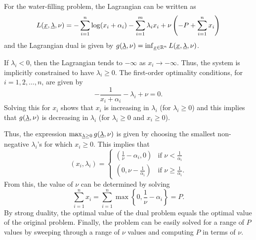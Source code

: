 \begin{example}
For the water-filling problem, the Lagrangian can be written as
\[ L(\underline{x},\underline{\lambda},\nu) = - \sum_{i=1}^n \log(x_i + \alpha_i) - \sum_{i=1}^m \lambda_i x_i + \nu \left( -P + \sum_{i=1}^n x_i \right)  \]
and the Lagrangian dual is given by $g(\underline{\lambda},\nu)
= \inf_{\underline{x}\in \mathbb{R}^n} L(\underline{x},\underline{\lambda},\nu)$.

If $\lambda_i <0$, then the Lagrangian tends to $-\infty$ as $x_i \to -\infty$.
Thus, the system is implicitly constrained to have $\lambda_i \geq 0$.
The first-order optimality conditions, for $i=1,2,\ldots,n$, are given by
\[ -\frac{1}{x_i + \alpha_i} - \lambda_i + \nu = 0.
\]
Solving this for $x_i$ shows that $x_i$ is increasing in $\lambda _i$ (for $\lambda_i \geq 0$) and this implies that $g(\underline{\lambda},\nu)$ is decreasing in $\lambda_i$ (for $\lambda_i \geq 0$ and $x_i \geq 0$).

Thus, the expression
$\max_{\underline{\lambda} \geq 0} g(\underline{\lambda},\nu)$
is given by choosing the smallest non-negative $\lambda_i$'s for which $x_i \geq 0$.
This implies that
\[ (x_i,\lambda_i) = \begin{cases} \left( \frac{1}{\nu} - \alpha _i, 0 \right) & \text{if }\nu < \frac{1}{\alpha_i} \\ \left(0,\nu-\frac{1}{\alpha_i}\right) & \text{if } \nu \geq \frac{1}{\alpha_i}. \end{cases} \]
From this, the value of $\nu$ can be determined by solving
\[\sum_{i=1}^n x_i = \sum_{i=1}^n \max \left\{ 0,\frac{1}{\nu}-\alpha_i \right\} = P. \]
By strong duality, the optimal value of the dual problem equals the optimal value of the original problem.
Finally, the problem can be easily solved for a range of $P$ values by sweeping through a range of $\nu$ values and computing $P$ in terms of $\nu$.
\end{example}

